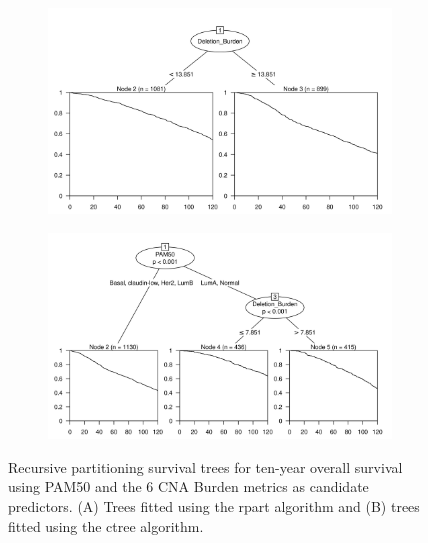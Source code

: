 \begin{figure}[!htb]
\centering

\vspace{0.5cm}

\begin{subfigure}{\textwidth}
\subcaption{}
\includegraphics[width=1\textwidth]{../figures/Appendices/Appendix_B/PartyKit_Survival_Burden_TenYearOS_PAM50.png}
\end{subfigure}

\vspace{2cm}

\begin{subfigure}{\textwidth}
\subcaption{}
\includegraphics[width=1\textwidth]{../figures/Appendices/Appendix_B/Ctree_Survival_Burden_TenYearOS_PAM50.png}
\end{subfigure}

\vspace{0.5cm}

\caption[Recursive partitioning survival trees for ten-year overall survival using PAM50 and the 6 CNA Burden metrics as candidate predictors.]{Recursive partitioning survival trees for ten-year overall survival using PAM50 and the 6 CNA Burden metrics as candidate predictors. (A) Trees fitted using the rpart algorithm and (B) trees fitted using the ctree algorithm.}
\end{figure}

